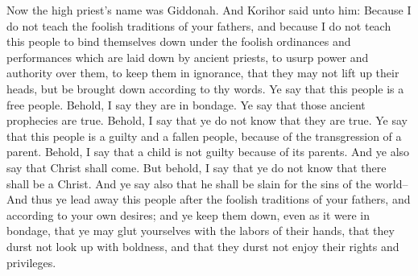 \bverse \iffalse Now the high priest's name was Giddonah. And Korihor said unto him: Because I do not teach the foolish traditions of your fathers, and because I do not teach this people to bind themselves down under the foolish ordinances and performances which are laid down by ancient priests, to usurp power and authority over them, to keep them in ignorance, that they may not lift up their heads, but be brought down according to thy words. \fi
Now the high priest's name was Giddonah. And Korihor said unto him: Because I do not teach the foolish traditions of your fathers, and because I do not teach this people to bind themselves down under the foolish ordinances and performances which are laid down by ancient priests, to usurp power and authority over them, to keep them in ignorance, that they may not lift up their heads, but be brought down according to thy words.
\bverse \iffalse Ye say that this people is a free people. Behold, I say they are in bondage. Ye say that those ancient prophecies are true.  Behold, I say that ye do not know that they are true. \fi
Ye say that this people is a free people. Behold, I say they are in bondage. Ye say that those ancient prophecies are true.  Behold, I say that ye do not know that they are true.
\bverse \iffalse Ye say that this people is a guilty and a fallen people, because of the transgression of a parent. Behold, I say that a child is not guilty because of its parents. \fi
Ye say that this people is a guilty and a fallen people, because of the transgression of a parent. Behold, I say that a child is not guilty because of its parents.
\bverse \iffalse And ye also say that Christ shall come. But behold, I say that ye do not know that there shall be a Christ. And ye say also that he shall be slain for the sins of the world-- \fi
And ye also say that Christ shall come. But behold, I say that ye do not know that there shall be a Christ. And ye say also that he shall be slain for the sins of the world--
\bverse \iffalse And thus ye lead away this people after the foolish traditions of your fathers, and according to your own desires; and ye keep them down, even as it were in bondage, that ye may glut yourselves with the labors of their hands, that they durst not look up with boldness, and that they durst not enjoy their rights and privileges. \fi
And thus ye lead away this people after the foolish traditions of your fathers, and according to your own desires; and ye keep them down, even as it were in bondage, that ye may glut yourselves with the labors of their hands, that they durst not look up with boldness, and that they durst not enjoy their rights and privileges.
